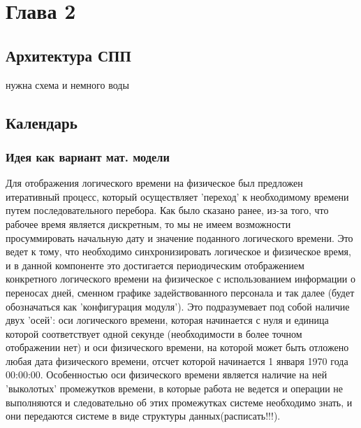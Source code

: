 \chapter{Глава 2}
\section{Архитектура СПП}
нужна схема и немного воды
\section{Календарь}
\subsection{Идея как вариант мат. модели}
Для отображения логического времени на физическое был предложен итеративный процесс, который осуществляет 'переход' к необходимому времени путем последовательного перебора.
\newline
Как было сказано ранее, из-за того, что рабочее время является дискретным, то мы не имеем возможности просуммировать начальную дату и значение поданного логического времени. Это ведет к тому, что необходимо синхронизировать логическое и физическое время, и в данной компоненте это достигается периодическим отображением конкретного логического времени на физическое с использованием информации о переносах дней, сменном графике задействованного персонала и так далее (будет обозначаться как 'конфигурация модуля').
\newline
Это подразумевает под собой наличие двух 'осей': оси логического времени, которая начинается с нуля и единица которой соответствует одной секунде (необходимости в более точном отображении нет) и оси физического времени, на которой может быть отложено любая дата физического времени, отсчет которой начинается 1 января 1970 года 00:00:00. Особенностью оси физического времени является наличие на ней 'выколотых' промежутков времени, в которые работа не ведется и операции не выполняются и следовательно об этих промежутках системе необходимо знать, и они передаются системе в виде структуры данных(расписать!!!).
\newline
